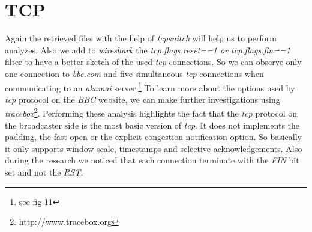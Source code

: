 \documentclass[conference]{IEEEtran}
\begin{document}







\section{TCP}
Again the retrieved files with the help of \textit{tcpsnitch} will help us to perform analyzes. Also we add to \textit{wireshark} the \textit{tcp.flags.reset==1 or tcp.flags.fin==1} filter to have a better sketch of the used \textit{tcp} connections. So we can observe only one connection to \textit{bbc.com} and five simultaneous \textit{tcp} connections when communicating to an \textit{akamai} server.\footnote{see fig 11} To learn more about the options used by \textit{tcp} protocol on the \textit{BBC} website, we can make further investigations using \textit{tracebox}\footnote{http://www.tracebox.org}. Performing these analysis highlights the fact that the \textit{tcp} protocol on the broadcaster side is the most basic version of \textit{tcp}. It does not implements the padding, the fast open or the explicit congestion notification option. So basically it only supports window scale, timestamps and selective acknowledgements. Also during the research we noticed that each connection terminate with the \textit{FIN} bit set and not the \textit{RST}.
\end{document}
